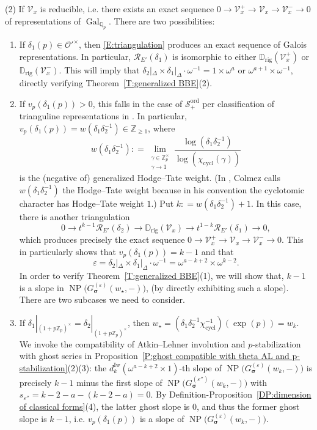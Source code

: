 \documentclass[12pt]{amsart}
\theoremstyle{definition}
\numberwithin{equation}{subsection}
\def\calO{\mathcal{O}}
\def\calR{\mathcal{R}}
\def\calV{\mathcal{V}}
\def\DD{\mathbb{D}}
\def\QQ{\mathbb{Q}}
\def\ZZ{\mathbb{Z}}
\DeclareMathOperator{\Gal}{Gal}
\DeclareMathOperator{\NP}{NP}
\newcommand{\bbsigma}{\boldsymbol{\sigma}}
\newcommand{\cycl}{\mathrm{cycl}}
\newcommand{\Iw}{\mathrm{Iw}}
\newcommand{\rig}{\mathrm{rig}}
\begin{document}
(2)
If $\calV_x$ is reducible, i.e. there exists an exact sequence $0 \to \calV_x^+ \to \calV_x \to \calV_x^- \to 0$ of representations of $\Gal_{\QQ_p}$. There are two possibilities: 
\begin{enumerate}
\item [(2a)] If $\delta_1(p) \in \calO'^\times$, then \eqref{E:triangulation} produces an exact sequence of Galois representations. In particular, $ \calR_{E'}(\delta_1)$ is isomorphic to either $\DD_\rig(\calV_x^+)$ or $\DD_\rig(\calV_x^-)$. This will imply that $\delta_2|_\Delta \times \delta_1|_\Delta \cdot \omega^{-1} = 1 \times \omega^a$ or $\omega^{a+1} \times \omega^{-1}$, directly verifying Theorem~\ref{T:generalized BBE}(2).



\item[(2b)] If $v_p(\delta_1(p)) >0$, this falls in the case of $\mathscr{S}_+^\mathrm{ord}$ per classification of trianguline  representations in \cite[\S\,1.2]{colmez-trianguline}. In particular, $v_p(\delta_1(p)) = w(\delta_1\delta_2^{-1}) \in \ZZ_{\geq 1}$, where $$ w(\delta_1\delta_2^{-1}): = \lim_{\substack{\gamma \in \ZZ_p^\times\\\gamma \to 1}}\frac{\log(\delta_1\delta_2^{-1})}{\log(\chi_\cycl(\gamma))}
$$ is the (negative of) generalized Hodge--Tate weight. (In \cite{colmez-trianguline}, Colmez calls $w(\delta_1\delta_2^{-1})$ the Hodge--Tate weight because in his convention the cyclotomic character has Hodge--Tate weight $1$.) Put $k: = w(\delta_1\delta_2^{-1})+1$. In this case, there is another triangulation
$$
0 \to t^{k-1}\calR_{E'}(\delta_2) \to \DD_\rig(\calV_x) \to t^{1-k}\calR_{E'}(\delta_1) \to 0,
$$
which produces precisely the exact sequence $0 \to \calV_x^+\to \calV_x \to \calV_x^- \to 0$. This in particularly shows that $v_p(\delta_1(p)) = k-1$ and that 
$$\varepsilon = \delta_2|_\Delta \times \delta_1|_\Delta \cdot \omega^{-1} =\omega^{a-k+2}  \times \omega^{k-2}.$$
In order to verify Theorem~\ref{T:generalized BBE}(1), we will show that, $k-1$ is a slope in $\NP\big( G_{\bbsigma}^{(\varepsilon)}(w_\star,-)\big)$, (by directly exhibiting such a slope).
There are two subcases we need to consider.

\item[(2bi)] If $\delta_1|_{(1+p\ZZ_p)^\times} =\delta_2|_{(1+p\ZZ_p)^\times}$, then $w_\star = (\delta_1\delta_2^{-1}\chi_\cycl^{-1})(\exp(p)) = w_k$. We invoke the compatibility of Atkin--Lehner involution  and $p$-stabilization with ghost series in Proposition~\ref{P:ghost compatible with theta AL and p-stabilization}(2)(3): the $d_k^\Iw(\omega^{a-k+2} \times1)$-th slope of $\NP\big(G_{\bbsigma}^{(\varepsilon)}(w_k, -)\big)$ is precisely $k-1$ minus the first slope of $\NP\big(G_{\bbsigma}^{(\varepsilon'')}(w_k, -)\big)$ with $s_{\varepsilon''}=k-2-a-(k-2-a)=0$. By Definition-Proposition~\ref{DP:dimension of classical forms}(4), the latter ghost slope is $0$, and thus the former ghost slope is $k-1$, i.e. $v_p(\delta_1(p))$ is a slope of $\NP\big(G_{\bbsigma}^{(\varepsilon)}(w_k, -)\big)$.



\end{enumerate}
\end{document}
